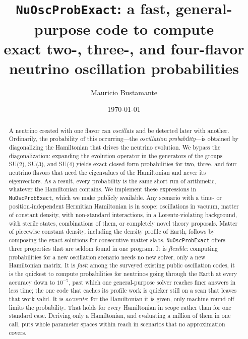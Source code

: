 \documentclass[final,5p,times,twocolumn,sort,compress]{elsarticle}
\begin{document}
\begin{frontmatter}

\title{{\tt NuOscProbExact}: a fast, general-purpose code to compute\\
exact two-, three-, and four-flavor neutrino oscillation probabilities}

\author{Mauricio Bustamante}
\address{Niels Bohr International Academy, Niels Bohr Institute,\\University of Copenhagen, DK-2100 Copenhagen, Denmark}

\date{\today}

\begin{abstract}

A neutrino created with one flavor can \textit{oscillate} and be detected later with another.  Ordinarily, the probability of this occurring---the \textit{oscillation probability}---is obtained by diagonalizing the Hamiltonian that drives the neutrino evolution.  We bypass the diagonalization: expanding the evolution operator in the generators of the groups SU(2), SU(3), and SU(4) yields exact closed-form probabilities for two, three, and four neutrino flavors that need the eigenvalues of the Hamiltonian and never its eigenvectors.  As a result, every probability is the same short run of arithmetic, whatever the Hamiltonian contains.  We implement these expressions in {\tt NuOscProbExact}, which we make publicly available.  Any scenario with a time- or position-independent Hermitian Hamiltonian is in scope: oscillations in vacuum, matter of constant density, with non-standard interactions, in a Lorentz-violating background, with sterile states, combinations of them, or completely novel theory proposals.  Matter of piecewise constant density, including the density profile of Earth, follows by composing the exact solutions for consecutive matter slabs.  {\tt NuOscProbExact} offers three properties that are seldom found in one program.  It is \emph{flexible}: computing probabilities for a new oscillation scenario needs no new solver, only a new Hamiltonian matrix.  It is \emph{fast}: among the surveyed existing public oscillation codes, it is the quickest to compute probabilities for neutrinos going through the Earth at every accuracy down to $10^{-7}$, past which one general-purpose solver reaches finer answers in less time; the one code that caches its profile work is quicker still on a scan that leaves that work valid.  It is \emph{accurate}: for the Hamiltonian it is given, only machine round-off limits the probability.  That holds for every Hamiltonian in scope rather than for one standard case.  Deriving only a Hamiltonian, and evaluating a million of them in one call, puts whole parameter spaces within reach in scenarios that no approximation covers.


\end{abstract}
\end{frontmatter}
\end{document}
